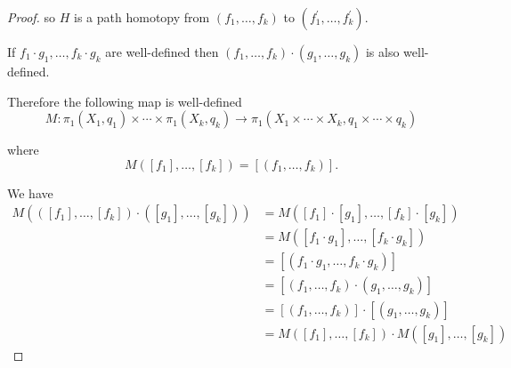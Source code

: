 \begin{proof}
    so \( H \) is a path homotopy from \( (f_{1}, \ldots, f_{k}) \) to \( (f_{1}^{\prime}, \ldots, f_{k}^{\prime}) \).

    If \( f_{1} \cdot g_{1}, \ldots, f_{k}\cdot g_{k} \) are well-defined then \( (f_{1}, \ldots, f_{k}) \cdot (g_{1}, \ldots, g_{k}) \) is also well-defined.

    Therefore the following map is well-defined
    \[
        M: \pi_{1}(X_{1}, q_{1}) \times \cdots \times \pi_{1}(X_{k}, q_{k}) \to \pi_{1}(X_{1} \times \cdots \times X_{k}, q_{1} \times \cdots \times q_{k})
    \]

    where
    \[
        M([f_{1}], \ldots, [f_{k}]) = [(f_{1}, \ldots, f_{k})].
    \]

    We have
    \begingroup
    \allowdisplaybreaks%
    \begin{align*}
        M(([f_{1}], \ldots, [f_{k}]) \cdot ([g_{1}], \ldots, [g_{k}])) & = M([f_{1}] \cdot [g_{1}], \ldots, [f_{k}] \cdot [g_{k}])       \\
                                                                       & = M([f_{1} \cdot g_{1}], \ldots, [f_{k} \cdot g_{k}])           \\
                                                                       & = [(f_{1}\cdot g_{1}, \ldots, f_{k} \cdot g_{k})]               \\
                                                                       & = [(f_{1}, \ldots, f_{k}) \cdot (g_{1}, \ldots, g_{k})]         \\
                                                                       & = [(f_{1}, \ldots, f_{k})] \cdot [(g_{1}, \ldots, g_{k})]       \\
                                                                       & = M([f_{1}], \ldots, [f_{k}]) \cdot M([g_{1}], \ldots, [g_{k}])
    \end{align*}
    \endgroup


\end{proof}
